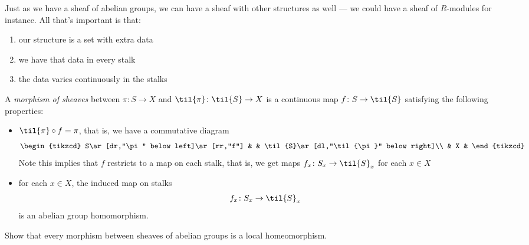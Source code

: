 \documentclass[11pt]{amsart}
\begin{document}
\begin{remark} Just as we have a sheaf of abelian groups, we can have a sheaf with other structures as well --- we could have a sheaf of $R$-modules for instance. All that's important is that:
\begin{enumerate}
    \item our structure is a set with extra data
    \item we have that data in every stalk
    \item the data varies continuously in the stalks
\end{enumerate}
\end{remark}

\begin{definition} A \emph{morphism of sheaves} between $\pi \colon S\to X$ and $\til{\pi} \colon \til{S} \to X$ is a continuous map $f \colon S \to \til{S}$ satisfying the following properties:
\begin{itemize}
    \item $\til{\pi}\circ f = \pi$, that is, we have a commutative diagram
\[ \begin{tikzcd}
    S\ar[dr,"\pi" below left]\ar[rr,"f"] &  & \til{S}\ar[dl,"\til{\pi}" below right]\\
     & X & 
\end{tikzcd} \]
    Note this implies that $f$ restricts to a map on each stalk, that is, we get maps $f_x \colon S_x \to \til{S}_x$ for each $x\in X$
    \item for each $x\in X$, the induced map on stalks
    \begin{align*}
        f_x \colon S_x \to \til{S}_x
    \end{align*}
    is an abelian group homomorphism.
\end{itemize}
\end{definition}

\begin{exercise} Show that every morphism between sheaves of abelian groups is a local homeomorphism.
\end{exercise}

\end{document}
